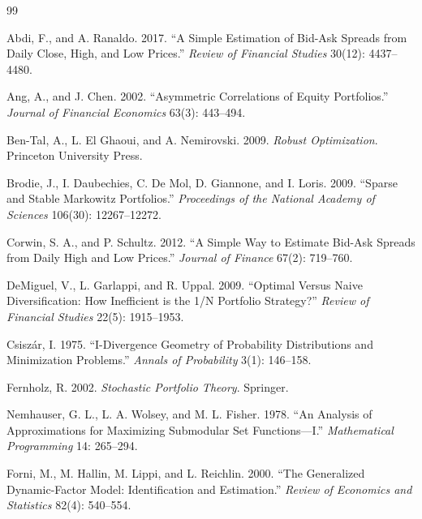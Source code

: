 \documentclass[11pt]{article}
\begin{document}
\newpage

\begin{thebibliography}{99}

Abdi, F., and A. Ranaldo. 2017.
``A Simple Estimation of Bid-Ask Spreads from Daily Close, High, and Low Prices.''
\textit{Review of Financial Studies} 30(12): 4437--4480.

Ang, A., and J. Chen. 2002.
``Asymmetric Correlations of Equity Portfolios.''
\textit{Journal of Financial Economics} 63(3): 443--494.

Ben-Tal, A., L. El Ghaoui, and A. Nemirovski. 2009.
\textit{Robust Optimization}.
Princeton University Press.

Brodie, J., I. Daubechies, C. De Mol, D. Giannone, and I. Loris. 2009.
``Sparse and Stable Markowitz Portfolios.''
\textit{Proceedings of the National Academy of Sciences} 106(30): 12267--12272.

Corwin, S. A., and P. Schultz. 2012.
``A Simple Way to Estimate Bid-Ask Spreads from Daily High and Low Prices.''
\textit{Journal of Finance} 67(2): 719--760.

DeMiguel, V., L. Garlappi, and R. Uppal. 2009.
``Optimal Versus Naive Diversification: How Inefficient is the 1/N Portfolio Strategy?''
\textit{Review of Financial Studies} 22(5): 1915--1953.


Csisz\'ar, I. 1975.
``I-Divergence Geometry of Probability Distributions and Minimization Problems.''
\textit{Annals of Probability} 3(1): 146--158.

Fernholz, R. 2002.
\textit{Stochastic Portfolio Theory}.
Springer.

Nemhauser, G. L., L. A. Wolsey, and M. L. Fisher. 1978.
``An Analysis of Approximations for Maximizing Submodular Set Functions---I.''
\textit{Mathematical Programming} 14: 265--294.

Forni, M., M. Hallin, M. Lippi, and L. Reichlin. 2000.
``The Generalized Dynamic-Factor Model: Identification and Estimation.''
\textit{Review of Economics and Statistics} 82(4): 540--554.


\end{thebibliography}
\end{document}
